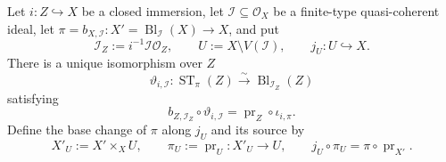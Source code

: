 \begin{lemma}
  \label{lemma:nagata-strict-transform-ambient-closed}
  \lean{}

  Let $i\colon Z\hookrightarrow X$ be a closed immersion, let
  $\mathcal I\subseteq\mathcal O_X$ be a finite-type quasi-coherent ideal,
  let
  $\pi=b_{X,\mathcal I}\colon X'=\operatorname{Bl}_{\mathcal I}(X)\to X$,
  and put
  \[
    \mathcal I_Z:=i^{-1}\mathcal I\mathcal O_Z,\qquad
    U:=X\setminus V(\mathcal I),\qquad
    j_U\colon U\hookrightarrow X.                               \tag{AC1}
  \]
  There is a unique
  isomorphism over $Z$
  \[
    \vartheta_{i,\mathcal I}\colon
      \operatorname{ST}_\pi(Z)\xrightarrow{\sim}
      \operatorname{Bl}_{\mathcal I_Z}(Z)
  \]
  satisfying
  \[
    b_{Z,\mathcal I_Z}\circ\vartheta_{i,\mathcal I}
      =\operatorname{pr}_Z\circ\iota_{i,\pi}.
  \]
  Define the base change of $\pi$ along $j_U$ and its source by
  \[
    X'_U:=X'\times_XU,
    \qquad
    \pi_U:=\operatorname{pr}_U\colon X'_U\longrightarrow U,
    \qquad
    j_U\circ\pi_U=\pi\circ\operatorname{pr}_{X'}.
  \]
  

\end{lemma}
